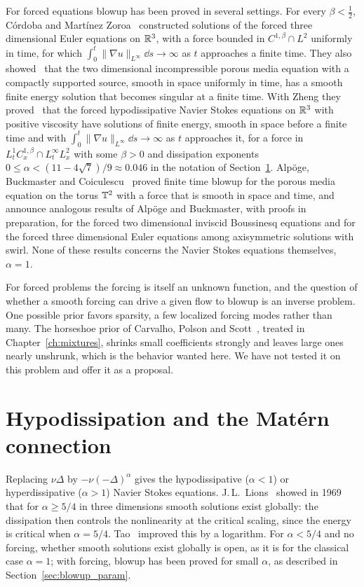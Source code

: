 For forced equations blowup has been proved in several settings. For every $\beta<\frac12$, C\'ordoba and Mart\'inez Zoroa~\cite{cordoba2023} constructed solutions of the forced three dimensional Euler equations on $\mathbb{R}^3$, with a force bounded in $C^{1,\beta}\cap L^2$ uniformly in time, for which $\int_0^t\|\nabla u\|_{L^\infty}\dd s\to\infty$ as $t$ approaches a finite time. They also showed~\cite{cordoba2024} that the two dimensional incompressible porous media equation with a compactly supported source, smooth in space uniformly in time, has a smooth finite energy solution that becomes singular at a finite time. With Zheng they proved~\cite{cordoba2026} that the forced hypodissipative Navier Stokes equations on $\mathbb{R}^3$ with positive viscosity have solutions of finite energy, smooth in space before a finite time and with $\int_0^t\|\nabla u\|_{L^\infty}\dd s\to\infty$ as $t$ approaches it, for a force in $L^1_tC^{1,\beta}_x\cap L^\infty_tL^2_x$ with some $\beta>0$ and dissipation exponents $0\leq\alpha<(11-4\sqrt7)/9\approx0.046$ in the notation of Section~\ref{sec:hypodiss}. Alp\"oge, Buckmaster and Coiculescu~\cite{alpoge2026} proved finite time blowup for the porous media equation on the torus $\mathbb{T}^2$ with a force that is smooth in space and time, and announce analogous results of Alp\"oge and Buckmaster, with proofs in preparation, for the forced two dimensional inviscid Boussinesq equations and for the forced three dimensional Euler equations among axisymmetric solutions with swirl. None of these results concerns the Navier Stokes equations themselves, $\alpha = 1$.

For forced problems the forcing is itself an unknown function, and the question of whether a smooth forcing can drive a given flow to blowup is an inverse problem. One possible prior favors sparsity, a few localized forcing modes rather than many. The horseshoe prior of Carvalho, Polson and Scott~\cite{carvalho2010}, treated in Chapter~\ref{ch:mixtures}, shrinks small coefficients strongly and leaves large ones nearly unshrunk, which is the behavior wanted here. We have not tested it on this problem and offer it as a proposal.

\section{Hypodissipation and the Mat\'ern connection}\label{sec:hypodiss}

Replacing $\nu\Delta$ by $-\nu(-\Delta)^\alpha$ gives the hypodissipative ($\alpha<1$) or hyperdissipative ($\alpha>1$) Navier Stokes equations. J.\,L.~Lions~\cite{lions1969} showed in 1969 that for $\alpha\geq5/4$ in three dimensions smooth solutions exist globally: the dissipation then controls the nonlinearity at the critical scaling, since the energy is critical when $\alpha = 5/4$. Tao~\cite{tao2009} improved this by a logarithm. For $\alpha<5/4$ and no forcing, whether smooth solutions exist globally is open, as it is for the classical case $\alpha = 1$; with forcing, blowup has been proved for small $\alpha$, as described in Section~\ref{sec:blowup_param}.

